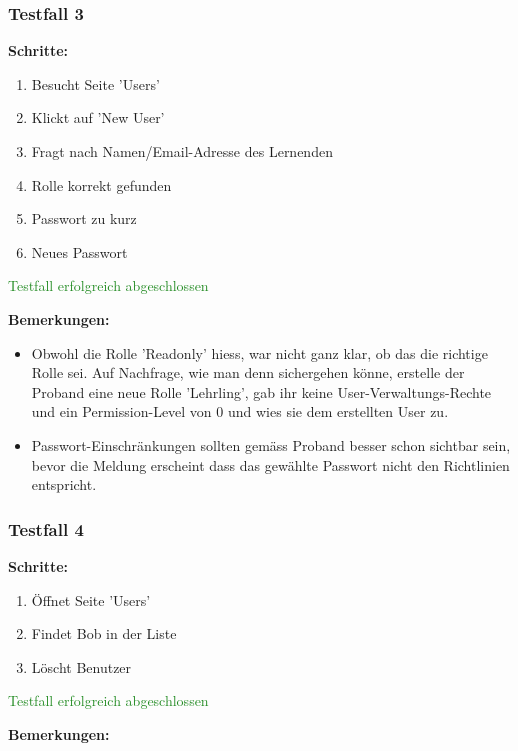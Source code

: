 \subsubsection*{Testfall 3}

\textbf{Schritte:}

\begin{enumerate}
    \item Besucht Seite 'Users'
    \item Klickt auf 'New User'
    \item Fragt nach Namen/Email-Adresse des Lernenden
    \item Rolle korrekt gefunden
    \item Passwort zu kurz
    \item Neues Passwort
\end{enumerate}

\textcolor{ForestGreen}{Testfall erfolgreich abgeschlossen}

\bigskip
\textbf{Bemerkungen:}

\begin{itemize}[noitemsep,nolistsep]
    \item Obwohl die Rolle 'Readonly' hiess, war nicht ganz klar, ob das die richtige Rolle sei. Auf Nachfrage, wie man denn sichergehen könne, erstelle der Proband eine neue Rolle 'Lehrling', gab ihr keine User-Verwaltungs-Rechte und ein Permission-Level von 0 und wies sie dem erstellten User zu.
    \item Passwort-Einschränkungen sollten gemäss Proband besser schon sichtbar sein, bevor die Meldung erscheint dass das gewählte Passwort nicht den Richtlinien entspricht.
\end{itemize}


\subsubsection*{Testfall 4}

\textbf{Schritte:}

\begin{enumerate}
    \item Öffnet Seite 'Users'
    \item Findet Bob in der Liste
    \item Löscht Benutzer
\end{enumerate}

\textcolor{ForestGreen}{Testfall erfolgreich abgeschlossen}

\bigskip
\textbf{Bemerkungen:}


